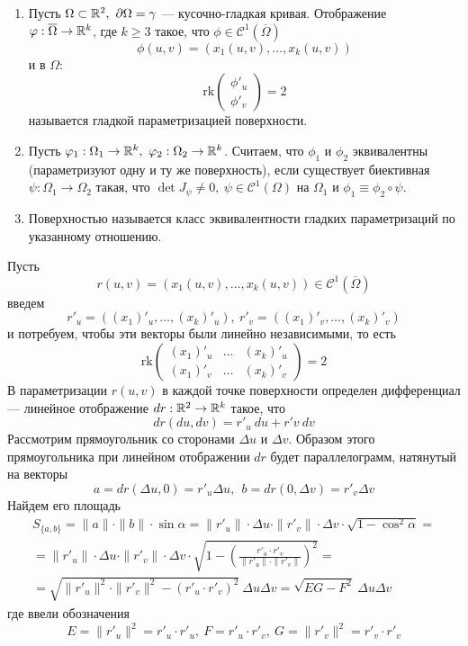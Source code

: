 \begin{definition}\label{surface}\tab
    \begin{enumerate}
        \item Пусть $\Omega\subset\R^2,\ \partial\Omega=\gamma$ --- кусочно-гладкая кривая. Отображение\\
        $\varphi:\overline{\Omega}\to\mathbb{R}^k$, где $k\geq 3$ такое, что $\phi\in \mathcal{C}^1(\overline{\Omega})$
        \[\phi(u,v)=(x_1(u,v),\dots,x_k(u,v))\]
        и в $\Omega$:
        \[\text{rk}\begin{pmatrix}
            \phi'_u\\
            \phi'_v
        \end{pmatrix}=2\]
        называется гладкой параметризацией поверхности.
        \item Пусть $\phi_1: \Omega_1\to \R^k,\ \phi_2: \Omega_2\to \R^k$. Считаем, что $\phi_1$ и $\phi_2$ эквивалентны (параметризуют одну и ту же поверхность), если существует биективная $\psi:\Omega_1\to \Omega_2$ такая, что $\det{J_{\psi}}\neq 0,\ \psi\in \mathcal{C}^1(\Omega)$ на $\Omega_1$ и $\phi_1\equiv\phi_2\circ\psi$.
        \item Поверхностью называется класс эквивалентности гладких параметризаций по указанному отношению.
    \end{enumerate}
\end{definition}
\begin{comm}
    Пусть
    \[r(u,v)=(x_1(u,v),\dots,x_k(u,v))\in \mathcal{C}^1(\overline{\Omega})\]
    введем
    \[r'_u=((x_1)'_u,\dots,(x_k)'_u),\ r'_v=((x_1)'_v,\dots,(x_k)'_v)\]
    и потребуем, чтобы эти векторы были линейно независимыми, то есть
    \[\text{rk}\begin{pmatrix}
        (x_1)'_u & \dots & (x_k)'_u\\
        (x_1)'_v & \dots & (x_k)'_v
    \end{pmatrix}=2\]
    В параметризации $r(u,v)$ в каждой точке поверхности определен дифференциал --- линейное отображение $dr:\mathbb{R}^2\to\mathbb{R}^k$ такое, что 
    \[dr(du,dv)=r'_u\ du+r'v\ dv\] 
    Рассмотрим прямоугольник со сторонами $\Delta u$ и $\Delta v$. Образом этого прямоугольника при линейном отображении $dr$ будет параллелограмм, натянутый на векторы 
    \[a=dr(\Delta u,0)=r'_u \Delta u,\ \ b=dr(0,\Delta v)=r'_v \Delta v\]
    Найдем его площадь
    \begin{multline*}
        S_{\{a,b\}}=\|a\|\cdot \|b\|\cdot \sin{\alpha}=\|r'_u\|\cdot \Delta u\cdot \|r'_v\|\cdot \Delta v\cdot \sqrt{1-\cos^2{\alpha}}=\\
        =\|r'_u\|\cdot \Delta u\cdot \|r'_v\|\cdot \Delta v\cdot \sqrt{1-\left(\frac{r'_u\cdot r'_v}{\|r'_u\|\cdot \|r'_v\|}\right)^2}=\\
        =\sqrt{\|r'_u\|^2\cdot \|r'_v\|^2-(r'_u\cdot r'_v)^2}\ \Delta u\Delta v=\sqrt{EG-F^2}\ \Delta u\Delta v
    \end{multline*}
    где ввели обозначения
    \[E=\|r'_u\|^2=r'_u\cdot r'_u,\ F=r'_u\cdot r'_v,\ G=\|r'_v\|^2=r'_v\cdot r'_v\]
\end{comm}
